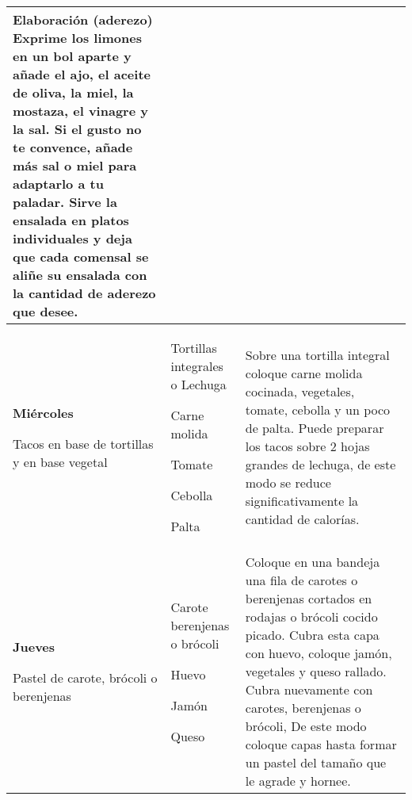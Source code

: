 \documentclass[menu.tex]{subfiles}
\begin{document}
\begin{tabular} {p{3cm} p{4.5cm} p{9cm}}
Elaboración (aderezo)
Exprime los limones en un bol aparte y añade el ajo, el aceite de oliva, la miel, la mostaza, el vinagre y la sal. Si el gusto no te convence, añade más sal o miel para adaptarlo a tu paladar. Sirve la ensalada en platos individuales y deja que cada comensal se aliñe su ensalada con la cantidad de aderezo que desee.\\
\hline

\pbox{20cm}
{
    \rule{0pt}{3ex}\begin{large}\textbf{Miércoles}\end{large}\\
    \rule{0pt}{2ex}Tacos en base de \\ tortillas y en base \\ vegetal
}&
\vspace{-0.8cm}
\begin{compactitem} 
    \begin{footnotesize}
        \item Tortillas integrales o Lechuga
        \item Carne molida
        \item Tomate
        \item Cebolla
        \item Palta
    \end{footnotesize}
\end{compactitem}&
\vspace{-0.8cm}
Sobre una tortilla integral coloque carne molida cocinada, vegetales, tomate, cebolla y un poco de palta. Puede preparar los tacos sobre 2 hojas grandes de lechuga, de este modo se reduce significativamente la cantidad de calorías.\\
\hline

\pbox{20cm}
{
    \rule{0pt}{3ex}\begin{large}\textbf{Jueves}\end{large}\\
    \rule{0pt}{2ex}Pastel de carote,\\ brócoli o \\berenjenas
} & 
\vspace{-0.8cm}
\begin{compactitem} 
    \begin{footnotesize}
        \item Carote berenjenas o brócoli
        \item Huevo
        \item Jamón
        \item Queso
    \end{footnotesize}
\end{compactitem}&
\vspace{-0.8cm}
Coloque en una bandeja una fila de carotes o berenjenas cortados en rodajas o brócoli cocido picado. Cubra esta capa con huevo, coloque jamón, vegetales y queso rallado. Cubra nuevamente con carotes, berenjenas o brócoli, De este modo coloque capas hasta formar un pastel del tamaño que le agrade y hornee.\\
\hline


\end{tabular}
\end{document}
